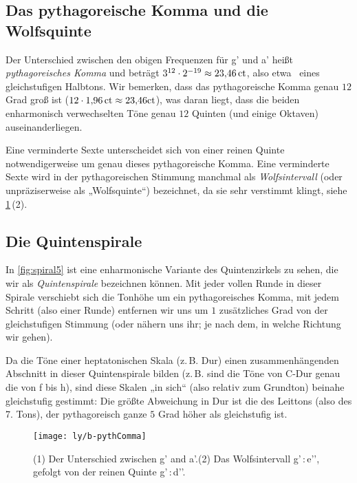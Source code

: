 \subsection{Das pythagoreische Komma und die Wolfsquinte}
\label{sec:pythComma}

Der Unterschied zwischen den obigen Frequenzen für \sharp g’ und \flat a’ heißt
\emph{pythagoreisches Komma} und beträgt
$3^{12}\cdot 2^{-19}\approx 23{,}46\,\text{ct}$, also etwa \ eines
gleichstufigen Halbtons. Wir bemerken, dass das pythagoreische Komma genau $12$
Grad groß ist ($12\cdot 1{,}96\,\mathrm{ct}\approx 23{,}46\mathrm{ct}$), was daran
liegt, dass die beiden enharmonisch verwechselten Töne genau $12$ Quinten (und
einige Oktaven) auseinanderliegen.

Eine verminderte Sexte unterscheidet sich von einer reinen Quinte
notwendigerweise um genau dieses pythagoreische Komma. Eine verminderte Sexte
wird in der pythagoreischen Stimmung manchmal als \emph{Wolfsintervall} (oder
unpräziserweise als „Wolfsquinte“) bezeichnet, da sie sehr verstimmt
klingt, siehe \cref{fig:pythComma}\,(2).

\subsection{Die Quintenspirale}

In \cref{fig:spiral5} ist eine enharmonische Variante des Quintenzirkels zu
sehen, die wir als \emph{Quintenspirale} bezeichnen können. Mit jeder vollen
Runde in dieser Spirale verschiebt sich die Tonhöhe um ein pythagoreisches
Komma, mit jedem Schritt (also  einer Runde) entfernen wir uns um
$1$ zusätzliches Grad von der gleichstufigen Stimmung (oder nähern uns ihr; je
nach dem, in welche Richtung wir gehen).

Da die Töne einer heptatonischen Skala (z.\,B. Dur) einen zusammenhängenden
Abschnitt in dieser Quintenspirale bilden (z.\,B. sind die Töne von C-Dur genau
die von f bis h), sind diese Skalen „in sich“ (also relativ zum Grundton)
beinahe gleichstufig gestimmt: Die größte Abweichung in Dur ist die des Leittons
(also des 7. Tons), der pythagoreisch ganze $5$ Grad höher als gleichstufig ist.

\begin{figure}[h]
  \centering
  \texttt{[image: ly/b-pythComma]}
  \caption{(1) Der Unterschied zwischen \sharp g’ and \flat a’.\quad (2) Das
    Wolfsintervall \sharp g’\,:\,\flat e’’, gefolgt von der reinen Quinte \sharp
    g’\,:\,\sharp d’’.}\label{fig:pythComma}
\end{figure}

